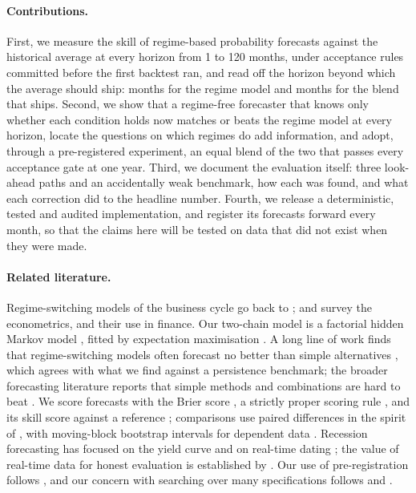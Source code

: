 \documentclass[11pt]{article}
\begin{document}
\paragraph{Contributions.} First, we measure the skill of regime-based probability forecasts against the
historical average at every horizon from 1 to 120 months, under acceptance rules committed before the
first backtest ran, and read off the horizon beyond which the average should ship: \ModelHorizon{} months
for the regime model and \BlendHorizon{} months for the blend that ships. Second, we show that a
regime-free forecaster that knows only whether each condition holds now matches or beats the regime model
at every horizon, locate the questions on which regimes do add information, and adopt, through a
pre-registered experiment, an equal blend of the two that passes every acceptance gate at one year.
Third, we document the evaluation itself: three look-ahead paths and an accidentally weak benchmark, how
each was found, and what each correction did to the headline number. Fourth, we release a deterministic,
tested and audited implementation, and register its forecasts forward every month, so that the claims
here will be tested on data that did not exist when they were made.

\paragraph{Related literature.} Regime-switching models of the business cycle go back to
\citet{hamilton1989new}; \citet{kim1999statespace} and \citet{hamilton2016macroeconomic} survey the
econometrics, and \citet{ang2012regime} their use in finance. Our two-chain model is a factorial hidden
Markov model \citep{ghahramani1997factorial}, fitted by expectation maximisation
\citep{baum1970maximization,dempster1977maximum}. A long line of work finds that regime-switching models
often forecast no better than simple alternatives \citep{clements1998comparison,dacco1999why}, which
agrees with what we find against a persistence benchmark; the broader forecasting literature reports
that simple methods and combinations are hard to beat \citep{bates1969combination,timmermann2006forecast,
makridakis2018m4}. We score forecasts with the Brier score \citep{brier1950verification}, a strictly
proper scoring rule \citep{gneiting2007strictly}, and its skill score against a reference
\citep{murphy1973new,murphy1988skill}; comparisons use paired differences in the spirit of
\citet{diebold1995comparing}, with moving-block bootstrap intervals for dependent data
\citep{kunsch1989jackknife,efron1979bootstrap}. Recession forecasting has focused on the yield curve
\citep{estrella1998predicting,estrella2006yield,rudebusch2009forecasting} and on real-time dating
\citep{chauvet2008comparison}; the value of real-time data for honest evaluation is established by
\citet{croushore2001realtime}. Our use of pre-registration follows \citet{nosek2018preregistration}, and
our concern with searching over many specifications follows \citet{white2000reality} and
\citet{harvey2016cross}.
\end{document}

